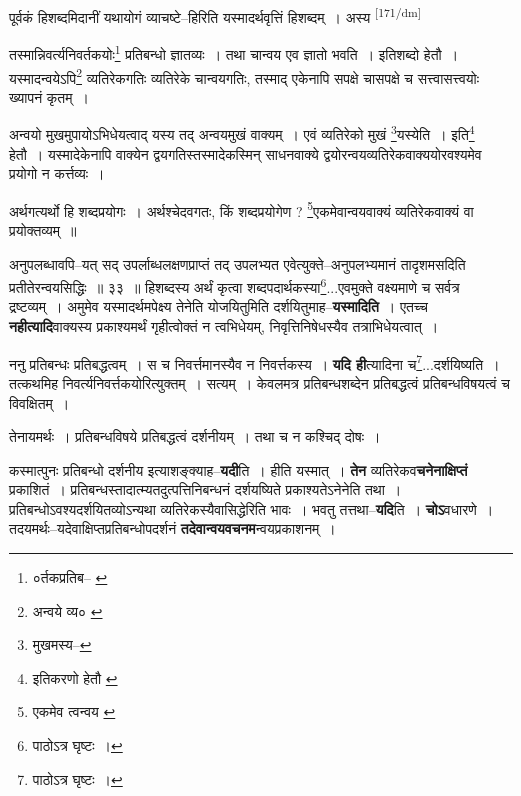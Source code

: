 \documentclass[article,12pt,a4paper]{memoir}
\begin{document}
	  \pstart पूर्वकं हिशब्दमिदानीं यथायोगं व्याचष्टे--हिरिति यस्मादर्थवृत्तिं हिशब्दम् । अस्य  \leavevmode\textsuperscript{\rmlatinfont\tiny [171/dm]} 
	  
	तस्मान्निवर्त्यनिवर्तकयोः\footnote{०र्तकप्रतिब--\cite{dp-msA} \cite{dp-msD} \cite{dp-edP} \cite{dp-edH} \cite{dp-edE}} प्रतिबन्धो ज्ञातव्यः । तथा चान्वय एव ज्ञातो भवति । इतिशब्दो हेतौ । यस्मादन्वयेऽपि\footnote{अन्वये व्य० \cite{dp-msA} \cite{dp-edP} \cite{dp-edH} \cite{dp-edE} \cite{dp-edN}} व्यतिरेकगतिः व्यतिरेके चान्वयगतिः, तस्माद् एकेनापि सपक्षे चासपक्षे च सत्त्वासत्त्वयोः ख्यापनं कृतम् । 
	  
	अन्वयो मुखमुपायोऽभिधेयत्वाद् यस्य तद् अन्वयमुखं वाक्यम् । एवं व्यतिरेको मुखं \footnote{मुखमस्य--\cite{dp-msC}}यस्येति । इति\footnote{इतिकरणो हेतौ \cite{dp-msA}} हेतौ । यस्मादेकेनापि वाक्येन द्वयगतिस्तस्मादेकस्मिन् साधनवाक्ये द्वयोरन्वयव्यतिरेकवाक्ययोरवश्यमेव प्रयोगो न कर्त्तव्यः । 
	  
	अर्थगत्यर्थो हि शब्दप्रयोगः । अर्थश्चेदवगतः, किं शब्दप्रयोगेण ? \footnote{एकमेव त्वन्वय \cite{dp-msA} \cite{dp-edP} \cite{dp-edH} \cite{dp-edE} \cite{dp-edN}}एकमेवान्वयवाक्यं व्यतिरेकवाक्यं वा प्रयोक्तव्यम् ॥ 
	  
	अनुपलब्धावपि--यत् सद् उपर्लाब्धलक्षणप्राप्तं तद् उपलभ्यत एवेत्युक्ते--अनुपलभ्यमानं तादृशमसदिति प्रतीतेरन्वयसिद्धिः ॥ ३३ ॥ हिशब्दस्य अर्थं कृत्वा शब्दपदार्थकस्या\footnote{पाठोऽत्र घृष्टः ।}...एवमुक्ते वक्ष्यमाणे च सर्वत्र द्रष्टव्यम् । अमुमेव यस्मादर्थमपेक्ष्य तेनेति योजयितुमिति दर्शयितुमाह--\textbf{यस्मादिति} । एतच्च \textbf{नहीत्यादि}वाक्यस्य प्रकाश्यमर्थं गृहीत्वोक्तं न त्वभिधेयम्, निवृत्तिनिषेधस्यैव तत्राभिधेयत्वात् ।
	\pend
      

	  \pstart ननु प्रतिबन्धः प्रतिबद्धत्वम् । स च निवर्त्तमानस्यैव न निवर्त्तकस्य । \textbf{यदि ही}त्यादिना च\footnote{पाठोऽत्र घृष्टः ।}...दर्शयिष्यति । तत्कथमिह निवर्त्यनिवर्त्तकयोरित्युक्तम् । सत्यम् । केवलमत्र प्रतिबन्धशब्देन प्रतिबद्धत्वं प्रतिबन्धविषयत्वं च विवक्षितम् ।
	\pend
      

	  \pstart तेनायमर्थः । प्रतिबन्धविषये प्रतिबद्धत्वं दर्शनीयम् । तथा च न कश्चिद् दोषः ।
	\pend
      

	  \pstart कस्मात्पुनः प्रतिबन्धो दर्शनीय इत्याशङ्क्याह--\textbf{यदी}ति । हीति यस्मात् । \textbf{तेन} व्यतिरेकव\textbf{चनेनाक्षिप्तं} प्रकाशितं । प्रतिबन्धस्तादात्म्यतदुत्पत्तिनिबन्धनं दर्शयष्यिते प्रकाश्यतेऽनेनेति तथा । प्रतिबन्धोऽवश्यदर्शयितव्योऽन्यथा व्यतिरेकस्यैवासिद्धेरिति भावः । भवतु तत्तथा--\textbf{यदि}ति । \textbf{चोऽ}वधारणे । तदयमर्थः--यदेवाक्षिप्तप्रतिबन्धोपदर्शनं \textbf{तदेवान्वयवचनम}न्वयप्रकाशनम् ।
	\pend
      
\end{document}
